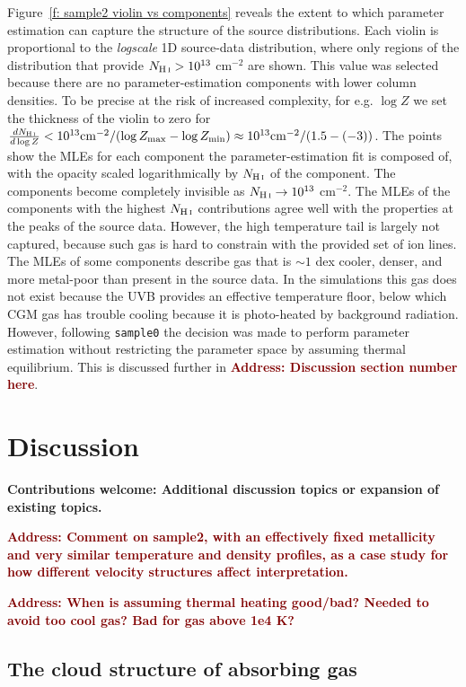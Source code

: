\documentclass[fleqn,usenatbib]{mnras}
\newcommand{\thoughts}[1]{\textcolor{BurntOrange}{\textbf{Contributions welcome: #1}}}
\newcommand{\todo}[1]{\textcolor{Maroon}{\textbf{Address: #1}}}
\begin{document}
Figure~\ref{f: sample2 violin vs components} reveals the extent to which parameter estimation can capture the structure of the source distributions.
Each violin is proportional to the \textit{logscale} 1D source-data distribution,
where only regions of the distribution that provide $N_{\ion{H}{I}} > 10^{13}$ cm$^{-2}$ are shown.
This value was selected because there are no parameter-estimation components with lower column densities.
To be precise at the risk of increased complexity,
for e.g. $\log Z$ we set the thickness of the violin to zero for $\frac{dN_{\ion{H}{I}}}{d\log Z} < 10^{13} {\rm cm}^{-2} / (\log Z_{\rm max} - \log Z_{\rm min} ) \approx 10^{13} {\rm cm}^{-2} / ( 1.5 - (-3) )$.
The points show the MLEs for each component the parameter-estimation fit is composed of,
with the opacity scaled logarithmically by $N_{\ion{H}{I}}$ of the component.
The components become completely invisible as $N_{\ion{H}{I}} \rightarrow 10^{13}$ cm$^{-2}$.
The MLEs of the components with the highest $N_{\ion{H}{I}}$ contributions agree well with the properties at the peaks of the source data.
However, the high temperature tail is largely not captured, because such gas is hard to constrain with the provided set of ion lines.
The MLEs of some components describe gas that is $\sim 1$ dex cooler, denser, and more metal-poor than present in the source data.
In the simulations this gas does not exist because the UVB provides an effective temperature floor,
below which CGM gas has trouble cooling because it is photo-heated by background radiation.
However, following \texttt{sample0} the decision was made to perform parameter estimation without restricting the parameter space by assuming thermal equilibrium.
This is discussed further in \todo{Discussion section number here}.

\section{Discussion}
\label{s: discussion}

\thoughts{Additional discussion topics or expansion of existing topics.}

\todo{Comment on sample2, with an effectively fixed metallicity and very similar temperature and density profiles, as a case study for  how different velocity structures affect interpretation.}

\todo{When is assuming thermal heating good/bad?
Needed to avoid too cool gas?
Bad for gas above 1e4 K?
}

\subsection{The cloud structure of absorbing gas}
\end{document}
